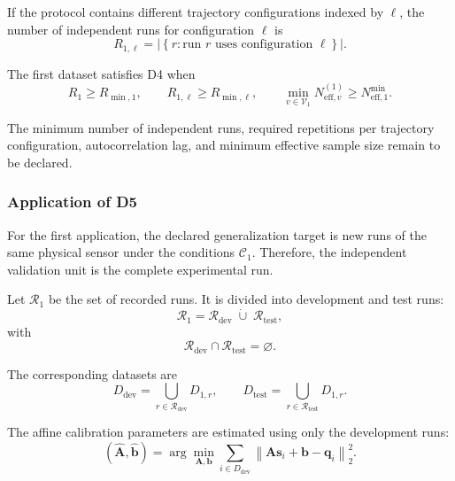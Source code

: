 \documentclass[11pt,a4paper]{article}
\begin{document}
If the protocol contains different trajectory configurations indexed by
$\ell$, the number of independent runs for configuration $\ell$ is
\begin{equation}
    R_{1,\ell}
    =
    \left|
        \left\{
            r :
            \text{run }r\text{ uses configuration }\ell
        \right\}
    \right|.
\end{equation}

The first dataset satisfies D4 when
\begin{equation}
    R_1\geq R_{\min,1},
    \qquad
    R_{1,\ell}\geq R_{\min,\ell},
    \qquad
    \min_{v\in\mathcal{V}_1}
    N_{\mathrm{eff},v}^{(1)}
    \geq
    N_{\mathrm{eff},1}^{\min}.
\end{equation}

The minimum number of independent runs, required repetitions per trajectory
configuration, autocorrelation lag, and minimum effective sample size remain to
be declared.

\subsubsection{Application of D5}

For the first application, the declared generalization target is new runs of
the same physical sensor under the conditions $\mathcal{C}_1$. Therefore, the
independent validation unit is the complete experimental run.

Let $\mathcal{R}_1$ be the set of recorded runs. It is divided into
development and test runs:
\begin{equation}
    \mathcal{R}_1
    =
    \mathcal{R}_{\mathrm{dev}}
    \;\dot{\cup}\;
    \mathcal{R}_{\mathrm{test}},
\end{equation}
with
\begin{equation}
    \mathcal{R}_{\mathrm{dev}}
    \cap
    \mathcal{R}_{\mathrm{test}}
    =
    \varnothing.
\end{equation}

The corresponding datasets are
\begin{equation}
    D_{\mathrm{dev}}
    =
    \bigcup_{r\in\mathcal{R}_{\mathrm{dev}}}D_{1,r},
    \qquad
    D_{\mathrm{test}}
    =
    \bigcup_{r\in\mathcal{R}_{\mathrm{test}}}D_{1,r}.
\end{equation}

The affine calibration parameters are estimated using only the development
runs:
\begin{equation}
    \left(
        \widehat{\mathbf{A}},
        \widehat{\mathbf{b}}
    \right)
    =
    \arg\min_{\mathbf{A},\mathbf{b}}
    \sum_{i\in D_{\mathrm{dev}}}
    \left\|
        \mathbf{A}\mathbf{s}_i
        +
        \mathbf{b}
        -
        \mathbf{q}_i
    \right\|_2^2.
\end{equation}
\end{document}
